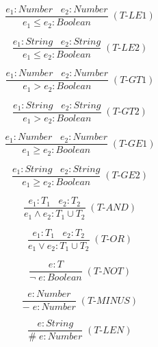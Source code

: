 \documentclass[12pt]{article}
\begin{document}
\[
\frac{e_{1}:Number \;\;\; e_{2}:Number}
     {e_{1} \le e_{2} : Boolean} \; (\textit{T-LE1})
\]

\[
\frac{e_{1}:String \;\;\; e_{2}:String}
     {e_{1} \le e_{2} : Boolean} \; (\textit{T-LE2})
\]

\[
\frac{e_{1}:Number \;\;\; e_{2}:Number}
     {e_{1} > e_{2} : Boolean} \; (\textit{T-GT1})
\]

\[
\frac{e_{1}:String \;\;\; e_{2}:String}
     {e_{1} > e_{2} : Boolean} \; (\textit{T-GT2})
\]

\[
\frac{e_{1}:Number \;\;\; e_{2}:Number}
     {e_{1} \ge e_{2} : Boolean} \; (\textit{T-GE1})
\]

\[
\frac{e_{1}:String \;\;\; e_{2}:String}
     {e_{1} \ge e_{2} : Boolean} \; (\textit{T-GE2})
\]

\[
\frac{e_{1}:T_{1} \;\;\; e_{2}:T_{2}}
     {e_{1} \land e_{2} : T_{1} \cup T_{2}} \; (\textit{T-AND})
\]

\[
\frac{e_{1}:T_{1} \;\;\; e_{2}:T_{2}}
     {e_{1} \lor e_{2} : T_{1} \cup T_{2}} \; (\textit{T-OR})
\]

\[
\frac{e : T}
     {\lnot \; e : Boolean} \; (\textit{T-NOT})
\]

\[
\frac{e : Number}
     {- \; e : Number} \; (\textit{T-MINUS})
\]

\[
\frac{e : String}
     {\# \; e : Number} \; (\textit{T-LEN})
\]
\end{document}
